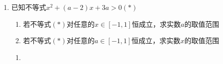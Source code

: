 \begin{enumerate}
\begin{enumerate}
\begin{jieda}
\begin{enumerate}
                因式分解有$(x-1)(x-3) > -p(x-1)$ \\
                下面根据$x$的取值范围进行分类讨论：
                综上，当$x \in (-\infty, -1) \cup (3, +\infty)$时不等式恒成立。
                \item 方法2：看做是关于$x$的一元二次不等式求解 \\
                不等式移项得到$x^2 + (p-4)x + (3-p) > 0$。即$(x-(3-p))(x-1) > 0$ \\
                因此根据两解可以写出不等式的解集为$\left \{
                    \begin{array}{ll}
                         (-\infty, 3-p) \cup (1, +\infty) & 4 \geq p \geq 2 \\
                         (-\infty, 1) \cup (3-p, +\infty) & 0 \leq p < 2
                    \end{array}
                \right. $ \\
                要使得不等式在$p$取到$[0, 4]$内任意值时成立，则应取所有$p$所对应的解集的交集，故当$x \in (-\infty, -1) \cup (3, +\infty)$时不等式恒成立。
            \end{enumerate}
            \ps 通过对比可知以$p$为主元更容易理解和推广。
        \end{jieda}
        \item 已知不等式$x^2+(a-2)x+3a>0(*)$
        \begin{enumerate}
            \item 若不等式$(*)$对任意的$x \in [-1, 1]$恒成立，求实数$a$的取值范围
            \item 若不等式$(*)$对任意的$a \in [-1, 1]$恒成立，求实数$x$的取值范围
        \end{enumerate}
        \begin{jieda}
            \begin{enumerate}
                \item 
\end{enumerate}
\end{jieda}
\end{enumerate}
\end{enumerate}
